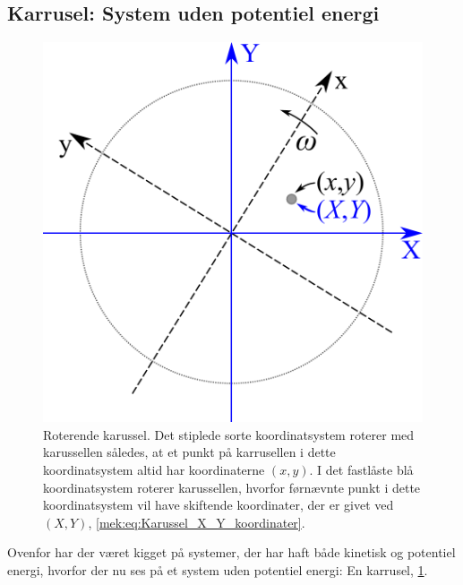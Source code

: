 \subsection{Karrusel: System uden potentiel energi} \label{sec:Karrusel}
\begin{figure}
	\centering
	\includegraphics[width=0.4\columnwidth]{figurer/Karussel.pdf}
	\caption{Roterende karussel. Det stiplede sorte koordinatsystem roterer med karussellen således, at et punkt på karrusellen i dette koordinatsystem altid har koordinaterne $(x,y)$. I det fastlåste blå koordinatsystem roterer karussellen, hvorfor førnævnte punkt i dette koordinatsystem vil have skiftende koordinater, der er givet ved $(X,Y)$, \cref{mek:eq:Karussel_X_Y_koordinater}.}
	\label{mek:fig:Karussel}
\end{figure}

Ovenfor har der været kigget på systemer, der har haft både kinetisk og potentiel energi, hvorfor der nu ses på et system uden potentiel energi: En karrusel, \cref{mek:fig:Karussel}.


